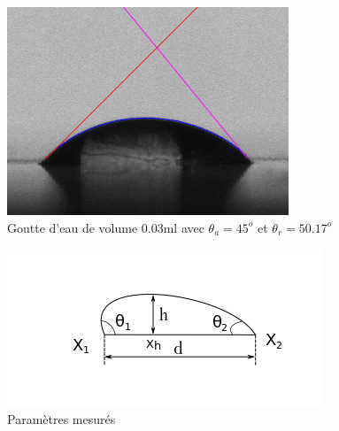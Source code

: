 \documentclass[french]{article}
\begin{document}
\begin{figure}[ht]
	\centering
	\includegraphics[scale = 0.6]{./image/crop_tvitesse=28_volume=003.png}
	\caption{Goutte d'eau de volume $0.03$ml avec $\theta_{a} = 45^{o}$ et $\theta_{r} = 50.17^{o}$}
\end{figure}

\begin{figure}[ht]
	\centering
	\includegraphics[scale = 1]{./image/rrgou2.png}
	\caption{Paramètres mesurés}
\end{figure}
\end{document}

